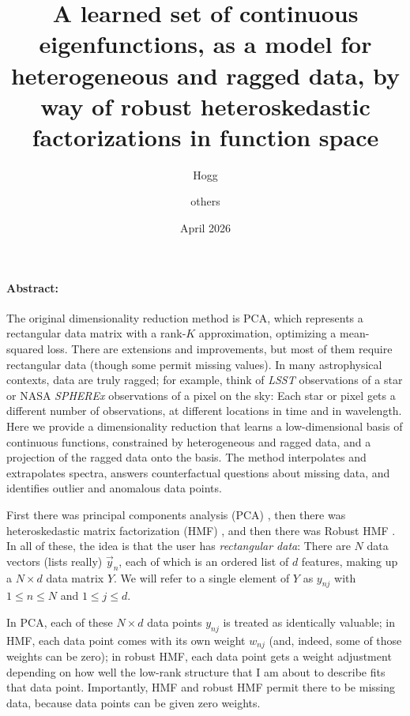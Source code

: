 \documentclass{article}
\title{\bfseries A learned set of continuous eigenfunctions, as a model for heterogeneous and ragged data, by way of robust heteroskedastic factorizations in function space}
\author{Hogg \and others}
\date{April 2026}
\begin{document}
\maketitle

\paragraph{Abstract:}
The original dimensionality reduction method is PCA, which represents a rectangular data matrix with a rank-$K$ approximation, optimizing a mean-squared loss.
There are extensions and improvements, but most of them require rectangular data (though some permit missing values).
In many astrophysical contexts, data are truly ragged; for example,
think of \textsl{LSST} observations of a star or NASA \textsl{SPHEREx} observations of a pixel on the sky:
Each star or pixel gets a different number of observations, at different locations in time and in wavelength.
Here we provide a dimensionality reduction that learns a low-dimensional basis of continuous functions, constrained by heterogeneous and ragged data, and a projection of the ragged data onto the basis.
The method interpolates and extrapolates spectra, answers counterfactual questions about missing data, and identifies outlier and anomalous data points.

\bigskip\noindent
First there was principal components analysis (PCA) \cite{pca},
then there was heteroskedastic matrix factorization (HMF) \cite{hmf},
and then there was Robust HMF \cite{rhmf}.
In all of these, the idea is that the user has \emph{rectangular data}:
There are $N$ data vectors (lists really) $\vec{y}_n$, each of which is an ordered list of $d$ features, making up a $N\times d$ data matrix $Y$.
We will refer to a single element of $Y$ as $y_{nj}$ with $1\leq n\leq N$ and $1\leq j\leq d$.

In PCA, each of these $N\times d$ data points $y_{nj}$ is treated as identically valuable;
in HMF, each data point comes with its own weight $w_{nj}$ (and, indeed, some of those weights can be zero);
in robust HMF, each data point gets a weight adjustment depending on how well the low-rank structure that I am about to describe fits that data point.
Importantly, HMF and robust HMF permit there to be missing data, because data points can be given zero weights.
\end{document}
